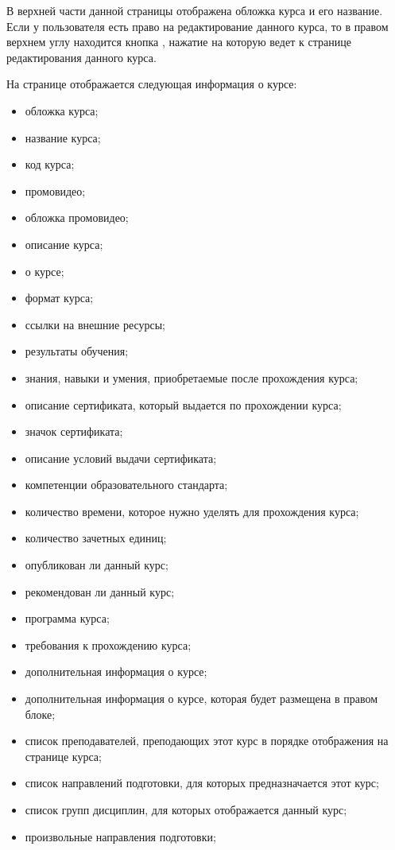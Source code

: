 В верхней части данной страницы отображена обложка курса и его название. Если у пользователя есть право на редактирование данного курса, то в правом верхнем углу находится кнопка , нажатие на которую ведет к странице редактирования данного курса.

На странице отображается следующая информация о курсе:
\begin{itemize}
	\item обложка курса;
	\item название курса;
	\item код курса;
	\item промовидео;
	\item обложка промовидео;
	\item описание курса;
	\item о курсе;
	\item формат курса;
	\item ссылки на внешние ресурсы;
	\item результаты обучения;
	\item знания, навыки и умения, приобретаемые после прохождения курса;
	\item описание сертификата, который выдается по прохождении курса;
	\item значок сертификата;
	\item описание условий выдачи сертификата;
	\item компетенции образовательного стандарта;
	\item количество времени, которое нужно уделять для прохождения курса;
	\item количество зачетных единиц;
	\item опубликован ли данный курс;
	\item рекомендован ли данный курс;
	\item программа курса;
	\item требования к прохождению курса;
	\item дополнительная информация о курсе;
	\item дополнительная информация о курсе, которая будет размещена в правом блоке;
	\item список преподавателей, преподающих этот курс в порядке отображения на странице курса;
	\item список направлений подготовки, для которых предназначается этот курс;
	\item список групп дисциплин, для которых отображается данный курс;
	\item произвольные направления подготовки;

\end{itemize}
